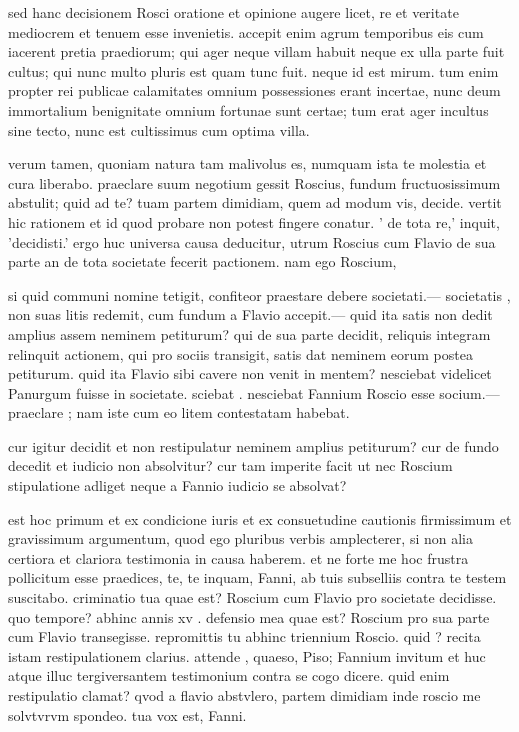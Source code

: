  sed hanc decisionem Rosci oratione et opinione augere licet, re et veritate mediocrem et tenuem esse invenietis. accepit enim agrum temporibus eis cum iacerent pretia praediorum; qui ager neque villam habuit neque ex ulla parte fuit cultus; qui nunc multo pluris est quam tunc fuit. neque id est mirum. tum enim propter rei publicae calamitates omnium possessiones erant incertae, nunc deum immortalium benignitate omnium fortunae sunt certae; tum erat ager incultus sine tecto, nunc est cultissimus cum optima villa.

 verum tamen, quoniam natura tam malivolus es, numquam ista te molestia et cura liberabo. praeclare suum negotium gessit Roscius, fundum fructuosissimum abstulit; quid ad te? tuam partem dimidiam, quem ad modum vis, decide. vertit hic rationem et id quod probare non potest fingere conatur. ' de tota re,' inquit, 'decidisti.' ergo huc universa causa deducitur, utrum Roscius cum Flavio de sua parte an de tota societate fecerit pactionem. nam ego Roscium,

 si quid communi nomine tetigit, confiteor praestare debere societati.— societatis , non suas litis redemit, cum fundum a Flavio accepit.— quid ita satis non dedit amplius assem neminem petiturum? qui de sua parte decidit, reliquis integram relinquit actionem, qui pro sociis transigit, satis dat neminem eorum postea petiturum. quid ita Flavio sibi cavere non venit in mentem? nesciebat videlicet Panurgum fuisse in societate. sciebat . nesciebat Fannium Roscio esse socium.— praeclare ; nam iste cum eo litem contestatam habebat.

 cur igitur decidit et non restipulatur neminem amplius petiturum? cur de fundo decedit et iudicio non absolvitur? cur tam imperite facit ut nec Roscium stipulatione adliget neque a Fannio iudicio se absolvat?

 est hoc primum et ex condicione iuris et ex consuetudine cautionis firmissimum et gravissimum argumentum, quod ego pluribus verbis amplecterer, si non alia certiora et clariora testimonia in causa haberem. et ne forte me hoc frustra pollicitum esse praedices, te, te inquam, Fanni, ab tuis subselliis contra te testem suscitabo. criminatio tua quae est? Roscium cum Flavio pro societate decidisse. quo tempore? abhinc annis xv . defensio mea quae est? Roscium pro sua parte cum Flavio transegisse. repromittis tu abhinc triennium Roscio. quid ? recita istam restipulationem clarius. attende , quaeso, Piso; Fannium invitum et huc atque illuc tergiversantem testimonium contra se cogo dicere. quid enim restipulatio clamat? qvod a flavio abstvlero, partem dimidiam inde roscio me solvtvrvm spondeo. tua vox est, Fanni.

